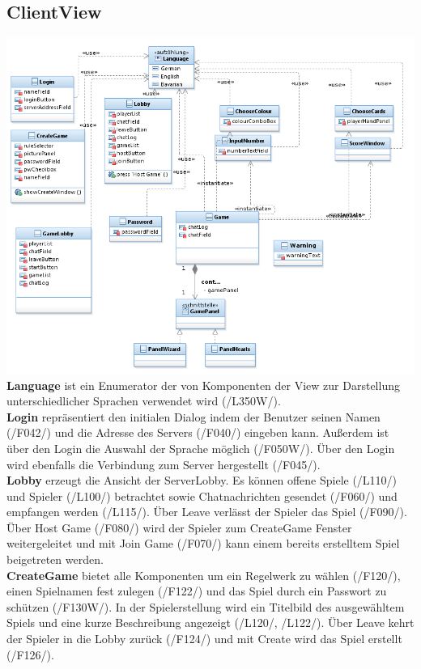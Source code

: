 \documentclass{article}
\begin{document}
\subsection{ClientView}
\includegraphics[width=\textwidth]{ClientView}
\textbf{Language} ist ein Enumerator der von Komponenten der View zur Darstellung unterschiedlicher Sprachen verwendet wird (/L350W/). \\
			\textbf{Login} repräsentiert den initialen Dialog indem der Benutzer seinen Namen (/F042/) und die Adresse des Servers (/F040/) eingeben kann. Außerdem ist über den Login die Auswahl der Sprache möglich (/F050W/). Über den Login wird ebenfalls die Verbindung zum Server hergestellt (/F045/).\\
			\textbf{Lobby} erzeugt die Ansicht der ServerLobby. Es können offene Spiele (/L110/) und Spieler (/L100/) betrachtet sowie Chatnachrichten gesendet (/F060/) und empfangen werden (/L115/). Über Leave verlässt der Spieler das Spiel (/F090/). Über Host Game (/F080/) wird der Spieler zum CreateGame Fenster weitergeleitet und mit Join Game (/F070/) kann einem bereits erstelltem Spiel beigetreten werden. \\
			\textbf{CreateGame} bietet alle Komponenten um ein Regelwerk zu wählen (/F120/), einen Spielnamen fest zulegen (/F122/) und das Spiel durch ein Passwort zu schützen (/F130W/). In der Spielerstellung wird ein Titelbild des ausgewähltem Spiels und eine kurze Beschreibung angezeigt (/L120/, /L122/). Über Leave kehrt der Spieler in die Lobby zurück (/F124/) und mit Create wird das Spiel erstellt (/F126/).\\
\end{document}
